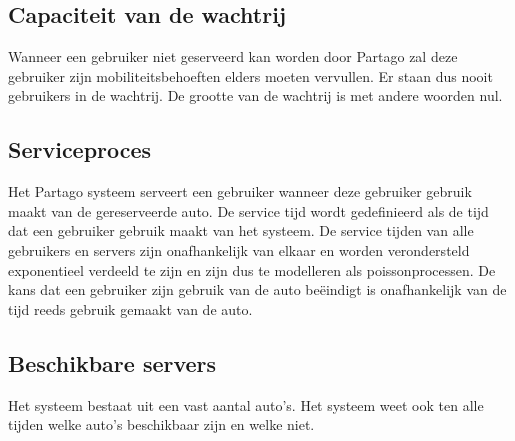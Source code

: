 \subsection{Capaciteit van de wachtrij}
Wanneer een gebruiker niet geserveerd kan worden door Partago zal deze gebruiker zijn mobiliteitsbehoeften elders moeten vervullen. Er staan dus nooit gebruikers in de wachtrij. De grootte van de wachtrij is met andere woorden nul.

\subsection{Serviceproces}
Het Partago systeem serveert een gebruiker wanneer deze gebruiker gebruik maakt van de gereserveerde auto. De service tijd wordt gedefinieerd als de tijd dat een gebruiker gebruik maakt van het systeem. De service tijden van alle gebruikers en servers zijn onafhankelijk van elkaar en worden verondersteld exponentieel verdeeld te zijn en zijn dus te modelleren als poissonprocessen. De kans dat een gebruiker zijn gebruik van de auto beëindigt is onafhankelijk van de tijd reeds gebruik gemaakt van de auto.

\subsection{Beschikbare servers}
Het systeem bestaat uit een vast aantal auto's. Het systeem weet ook ten alle tijden welke auto's beschikbaar zijn en welke niet.

